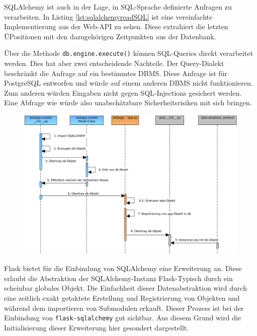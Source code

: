 SQLAlchemy ist auch in der Lage, in SQL-Sprache definierte Anfragen zu verarbeiten. In Listing \ref{lst:sqlalchemyreadSQL} ist eine vereinfachte Implementierung aus der Web-API zu sehen. Diese extrahiert die letzten ÜPositionen mit den dazugehörigen Zeitpunkten aus der Datenbank. 

    
Über die Methode \texttt{db.engine.execute()} können SQL-Queries direkt verarbeitet werden. Dies hat aber zwei entscheidende Nachteile. Der Query-Dialekt beschränkt die Anfrage auf ein bestimmtes DBMS. Diese Anfrage ist für PostgreSQL entworfen und würde auf einem anderen DBMS nicht funktionieren. Zum anderen würden Eingaben nicht gegen SQL-Injections gesichert werden. Eine Abfrage wie 
 würde also unabschätzbare Sicherheitsrisiken mit sich bringen.
\\


\begin{figure}[H]
 \centering
 \includegraphics[width=\textwidth]{pix/seq_db.png}
 \label{fig:sequenzSQLALCHEMY}
\end{figure}

Flask bietet für die Einbindung von SQLAlchemy eine Erweiterung an. Diese erlaubt die Abstraktion der SQLAlchemy-Instanz Flask-Typisch durch ein scheinbar globales Objekt. Die Einfachheit dieser Datenabstraktion wird durch eine zeitlich exakt getaktete Erstellung und Registrierung von Objekten und während dem importieren von Submodulen erkauft. Dieser Prozess ist bei der Einbindung von \texttt{flask-sqlalchemy} gut sichtbar. Aus diesem Grund wird die Initialisierung dieser Erweiterung hier gesondert dargestellt.

